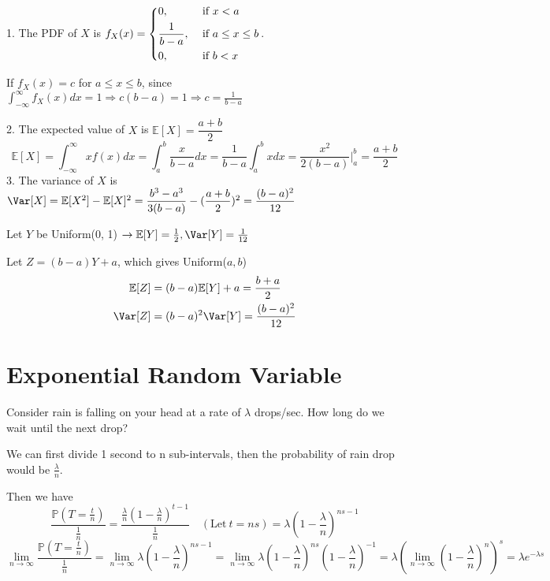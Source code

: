 1. The PDF of \(X\) is \(f_X(x) = \begin{dcases}
        0, &\text{ if } x < a \\
        \frac{1}{b - a}, &\text{ if } a \leq x \leq b \\
        0 , &\text{ if } b < x
    \end{dcases}\). 
    
    If \(f_X(x) = c\) for \(a \leq x \leq b\), since \(\displaystyle\int_{-\infty} ^{\infty} f_X(x)dx = 1 \Rightarrow c(b - a) = 1 \Rightarrow c = \frac{1}{b - a}\)

2. The expected value of \(X\) is \(\mathbb{E}[X] = \dfrac{a + b}{2}\)
    \[
        \mathbb{E}[X] = \int_{-\infty} ^{\infty} xf(x)dx = \int_{a} ^{b} \dfrac{x}{b - a}dx = \dfrac{1}{b - a}\int_{a} ^{b} xdx = \dfrac{x^2}{2(b - a)} \Big|_a^b = \dfrac{a + b}{2}
    \]
3. The variance of \(X\) is \(\Var[X] = \mathbb{E}[X^2] - \mathbb{E}[X]^2 = \dfrac{b^3 - a^3}{3(b - a)} - (\dfrac{a + b}{2})^2 = \dfrac{(b - a)^2}{12}\)
    
    Let \(Y\) be Uniform(0, 1) \(\rightarrow \mathbb{E}[Y] = \frac{1}{2}, \Var[Y] = \frac{1}{12}\) 

    Let \(Z = (b - a)Y + a\), which gives Uniform(\(a, b\)) 
    \[
    \begin{aligned}
        \mathbb{E}[Z] &= (b - a)\mathbb{E}[Y] + a = \frac{b + a}{2} \\
        \Var[Z] &= (b - a)^2 \Var[Y] = \frac{(b - a)^2}{12}
    \end{aligned}
    \]

\section{Exponential Random Variable}

Consider rain is falling on your head at a rate of \(\lambda\) drops/sec. How long do we wait until the next drop?

We can first divide 1 second to n sub-intervals, then the probability of rain drop would be \(\frac{\lambda}{n}\). 

Then we have 
\[
    \dfrac{\mathbb{P}(T = \frac{t}{n})}{\frac{1}{n}} = \frac{\frac{\lambda}{n}\left(1 - \frac{\lambda}{n}\right)^{t-1}}{\frac{1}{n}} \quad(\text{Let}\ t = ns) = \lambda\left(1 - \dfrac{\lambda}{n}\right)^{ns-1}
\]
\[
    \lim_{n \to \infty} \dfrac{\mathbb{P}(T = \frac{t}{n})}{\frac{1}{n}} = \lim_{n \to \infty} \lambda\left(1 - \dfrac{\lambda}{n}\right)^{ns-1} = \lim_{n \to \infty} \lambda\left(1 - \dfrac{\lambda}{n}\right)^{ns}\left(1 - \dfrac{\lambda}{n}\right)^{-1} = \lambda \left(\lim_{n \to \infty} \left(1 - \dfrac{\lambda}{n}\right)^n\right)^s = \lambda e^{-\lambda s}
\]

